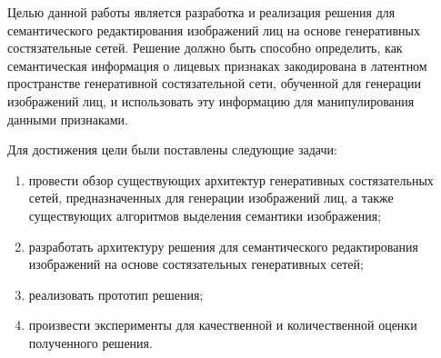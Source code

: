 Целью данной работы является разработка и реализация решения для семантического редактирования изображений лиц на основе генеративных состязательные сетей. 
Решение должно быть способно определить, как семантическая информация о лицевых признаках закодирована в латентном пространстве генеративной состязательной сети, обученной для генерации изображений лиц, и использовать эту информацию для манипулирования данными признаками.

Для достижения цели были поставлены следующие задачи:

\begin{enumerate}
\item провести обзор существующих архитектур генеративных состязательных сетей, предназначенных для генерации изображений лиц, а также существующих алгоритмов выделения семантики изображения;
\item разработать архитектуру решения для семантического редактирования изображений  на основе состязательных генеративных сетей;
\item реализовать прототип решения;
\item произвести эксперименты для качественной и количественной оценки полученного решения.
\end{enumerate}

